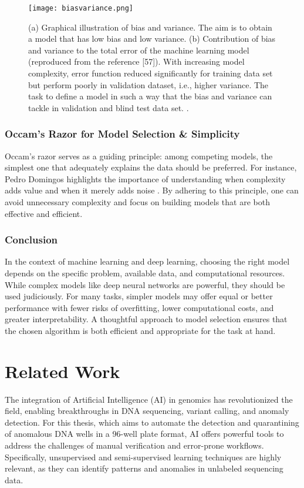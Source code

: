 \begin{figure}[H]
    \centering
    \texttt{[image: biasvariance.png]}
    \caption{(a) Graphical illustration of bias and variance. The aim is to obtain a model that has low bias and low variance. (b) Contribution of bias and variance to the total error of the machine learning model (reproduced from the reference [57]). With increasing model complexity, error function reduced significantly for training data set but perform poorly in validation dataset, i.e., higher variance. The task to define a model in such a way that the bias and variance can tackle in validation and blind test data set. \cite{bias_variance_illustration}.}
    \label{fig:biasvariance}
    \end{figure}

\subsubsection{Occam's Razor for Model Selection \& Simplicity}
Occam's razor \cite{britannica_occams_razor} serves as a guiding principle: among competing models, the simplest one that adequately explains the data should be preferred. For instance, Pedro Domingos highlights the importance of understanding when complexity adds value and when it merely adds noise \cite{domingos2012few}.
By adhering to this principle, one can avoid unnecessary complexity and focus on building models that are both effective and efficient.

\subsubsection{Conclusion}

In the context of machine learning and deep learning, choosing the right model depends on the specific problem, available data, and computational resources. While complex models like deep neural networks are powerful, they should be used judiciously. For many tasks, simpler models may offer equal or better performance with fewer risks of overfitting, lower computational costs, and greater interpretability. A thoughtful approach to model selection ensures that the chosen algorithm is both efficient and appropriate for the task at hand.

\section{Related Work}
The integration of Artificial Intelligence (AI) in genomics has revolutionized the field, enabling breakthroughs in DNA sequencing, variant calling, and anomaly detection. For this thesis, which aims to automate the detection and quarantining of anomalous DNA wells in a 96-well plate format, AI offers powerful tools to address the challenges of manual verification and error-prone workflows. Specifically, unsupervised and semi-supervised learning techniques are highly relevant, as they can identify patterns and anomalies in unlabeled sequencing data.

